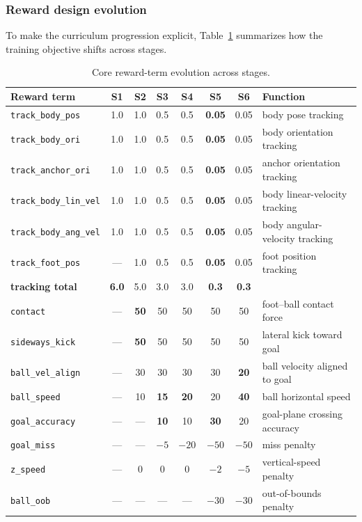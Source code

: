 \documentclass{article}
\newcommand{\code}[1]{\texttt{#1}}
\begin{document}
\subsubsection{Reward design evolution}\label{sec:sh-reward}

To make the curriculum progression explicit, Table~\ref{tab:sh-reward-evolution}
summarizes how the training objective shifts across stages.

\begin{table}[h]
\centering\footnotesize
\caption{Core reward-term evolution across stages.}
\label{tab:sh-reward-evolution}
\setlength{\tabcolsep}{4pt}
\begin{tabular}{@{}lccccccl@{}}
\toprule
Reward term & S1 & S2 & S3 & S4 & S5 & S6 & Function \\
\midrule
\code{track_body_pos}     & 1.0 & 1.0 & 0.5 & 0.5 & \textbf{0.05} & 0.05 & body pose tracking \\
\code{track_body_ori}     & 1.0 & 1.0 & 0.5 & 0.5 & \textbf{0.05} & 0.05 & body orientation tracking \\
\code{track_anchor_ori}   & 1.0 & 1.0 & 0.5 & 0.5 & \textbf{0.05} & 0.05 & anchor orientation tracking \\
\code{track_body_lin_vel} & 1.0 & 1.0 & 0.5 & 0.5 & \textbf{0.05} & 0.05 & body linear-velocity tracking \\
\code{track_body_ang_vel} & 1.0 & 1.0 & 0.5 & 0.5 & \textbf{0.05} & 0.05 & body angular-velocity tracking \\
\code{track_foot_pos}     & --- & 1.0 & 0.5 & 0.5 & \textbf{0.05} & 0.05 & foot position tracking \\
\textbf{tracking total}   & \textbf{6.0} & 5.0 & 3.0 & 3.0 & \textbf{0.3} & \textbf{0.3} & \\
\code{contact}            & --- & \textbf{50} & 50 & 50 & 50 & 50 & foot--ball contact force \\
\code{sideways_kick}      & --- & \textbf{50} & 50 & 50 & 50 & 50 & lateral kick toward goal \\
\code{ball_vel_align}     & --- & 30 & 30 & 30 & 30 & \textbf{20} & ball velocity aligned to goal \\
\code{ball_speed}         & --- & 10 & \textbf{15} & \textbf{20} & 20 & \textbf{40} & ball horizontal speed \\
\code{goal_accuracy}      & --- & --- & \textbf{10} & 10 & \textbf{30} & 20 & goal-plane crossing accuracy \\
\code{goal_miss}          & --- & --- & $-5$ & $-20$ & \textbf{$-50$} & $-50$ & miss penalty \\
\code{z_speed}            & --- & 0 & 0 & 0 & $-2$ & \textbf{$-5$} & vertical-speed penalty \\
\code{ball_oob}           & --- & --- & --- & --- & $-30$ & $-30$ & out-of-bounds penalty \\
\bottomrule
\end{tabular}
\end{table}
\end{document}
